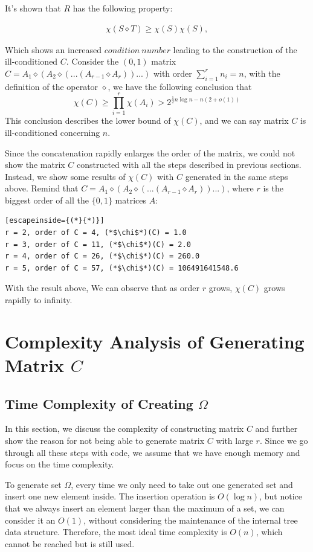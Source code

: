 \documentclass[11pt]{article}
\begin{document}
It's shown that $R$ has the following property:

\begin{align*}
\chi(S \diamond T) \geq \chi(S)\chi(S),
\end{align*}

Which shows an increased $condition\ number$ leading to the construction of the ill-conditioned $C$. Consider the $(0, 1)$ matrix $C = A_1 \diamond (A_2 \diamond (. . . (A_{r-1} \diamond A_r))...)$ with order $\sum_{i=1}^rn_i=n$, with the definition of the operator $\diamond$, we have the following conclusion that
$$\chi(C)\geq \prod_{i=1}^r\chi(A_i) > 2^{\frac{1}{2}n\log n-n(2+o(1))}$$
This conclusion describes the lower bound of $\chi(C)$, and we can say matrix $C$ is ill-conditioned concerning $n$.

Since the concatenation rapidly enlarges the order of the matrix, we could not show the matrix $C$ constructed with all the steps described in previous sections. Instead, we show some results of $\chi(C)$ with $C$ generated in the same steps above. Remind that $C = A_1 \diamond (A_2 \diamond (. . . (A_{r-1} \diamond A_r))...)$, where $r$ is the biggest order of all the $\{0, 1\}$ matrices $A$:

\begin{lstlisting}[escapeinside={(*}{*)}]
r = 2, order of C = 4, (*$\chi$*)(C) = 1.0
r = 3, order of C = 11, (*$\chi$*)(C) = 2.0
r = 4, order of C = 26, (*$\chi$*)(C) = 260.0
r = 5, order of C = 57, (*$\chi$*)(C) = 106491641548.6
\end{lstlisting}

With the result above, We can observe that as order $r$ grows, $\chi(C)$ grows rapidly to infinity.

\section{Complexity Analysis of Generating Matrix $C$}
\subsection{Time Complexity of Creating $\Omega$}
In this section, we discuss the complexity of constructing matrix $C$ and further show the reason for not being able to generate matrix $C$ with large $r$. Since we go through all these steps with code, we assume that we have enough memory and focus on the time complexity.

To generate set $\Omega$, every time we only need to take out one generated set and insert one new element inside. The insertion operation is $O(\log n)$, but notice that we always insert an element larger than the maximum of a set, we can consider it an $O(1)$, without considering the maintenance of the internal tree data structure. Therefore, the most ideal time complexity is $O(n)$, which cannot be reached but is still used.
\end{document}
